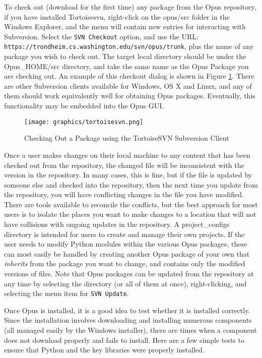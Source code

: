 To check out (download for the first time) any package from the Opus repository, if you have installed Tortoisesvn, right-click on the opus/src folder in the Windows Explorer, and the menu will contain new entries for interacting with Subversion.  Select the \verb#SVN Checkout# option, and use the URL: \verb#https://trondheim.cs.washington.edu/svn/opus/trunk#, plus the name of any package you wish to check out.  The target local directory should be under the Opus\_HOME/src directory, and take the same name as the Opus Package you are checking out.  An example of this checkout dialog is shown in Figure \ref{fig:tortoisesvn}.  There are other Subversion clients available for Windows, OS X and Linux, and any of them should work equivalently well for obtaining Opus packages.  Eventually, this functionality may be embedded into the Opus GUI.

\begin{figure}[htp]
\begin{center}
\texttt{[image: graphics/tortoisesvn.png]}
\end{center}
\caption{Checking Out a Package using the TortoiseSVN Subversion Client}
\label{fig:tortoisesvn}
\end{figure}

Once a user makes changes on their local machine to any content that has been checked out from the repository, the changed file will be inconsistent with the version in the repository.  In many cases, this is fine, but if the file is updated by someone else and checked into the repository, then the next time you update from the repository, you will have conflicting changes in the file you have modified.  There are tools available to reconcile the conflicts, but the best approach for most users is to isolate the places you want to make changes to a location that will not have collisions with ongoing updates in the repository.  A project\_configs directory is intended for users to create and manage their own projects.  If the user needs to modify Python modules within the various Opus packages, these can most easily be handled by creating another Opus package of your own that \emph{inherits} from the package you want to change, and contains only the modified versions of files.   Note that Opus packages can be updated from the repository at any time by selecting the directory (or all of them at once), right-clicking, and selecting the menu item for \verb#SVN Update#.

Once Opus is installed, it is a good idea to test whether it is installed correctly.  Since the installation involves downloading and installing numerous components (all managed easily by the Windows installer), there are times when a component does not download properly and fails to install.  Here are a few simple tests to ensure that Python and the key libraries were properly installed.

